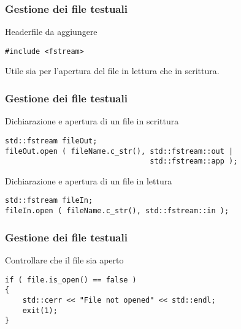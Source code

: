 \documentclass{beamer}
\author{Alessio Fumagalli}
\date{20-10-2011}
\institute{Politecnico di Milano}
\begin{document}

\begin{frame}[fragile]

    \frametitle{Gestione dei file testuali}

    \begin{block}{Headerfile da aggiungere}
        \begin{verbatim}
#include <fstream>
        \end{verbatim}
        Utile sia per l'apertura del file in lettura che in scrittura.
    \end{block}

\end{frame}


\begin{frame}[fragile]

    \frametitle{Gestione dei file testuali}

    \begin{block}{Dichiarazione e apertura di un file in scrittura}
        \begin{verbatim}
std::fstream fileOut;
fileOut.open ( fileName.c_str(), std::fstream::out |
                                 std::fstream::app );
        \end{verbatim}
    \end{block}

    \begin{block}{Dichiarazione e apertura di un file in lettura}
        \begin{verbatim}
std::fstream fileIn;
fileIn.open ( fileName.c_str(), std::fstream::in );
        \end{verbatim}
    \end{block}

\end{frame}


\begin{frame}[fragile]

    \frametitle{Gestione dei file testuali}

    \begin{block}{Controllare che il file sia aperto}
        \begin{verbatim}
if ( file.is_open() == false )
{
    std::cerr << "File not opened" << std::endl;
    exit(1);
}
        \end{verbatim}
    \end{block}

\end{frame}
\end{document}
